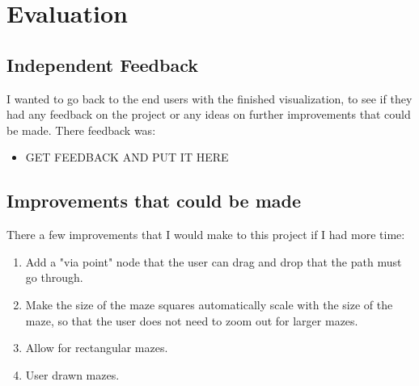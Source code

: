 \documentclass[titlepage]{article}
\begin{document}
\section{Evaluation}
\subsection{Independent Feedback}
I wanted to go back to the end users with the finished visualization, to see if they had any feedback on the project or any ideas on further improvements that could be made.
There feedback was:
\begin{itemize}
    \item GET FEEDBACK AND PUT IT HERE
\end{itemize}
\subsection{Improvements that could be made}
There a few improvements that I would make to this project if I had more time:
\begin{enumerate}
    \item Add a "via point" node that the user can drag and drop that the path must go through.
    \item Make the size of the maze squares automatically scale with the size of the maze, so that the user does not need to zoom out for larger mazes.
    \item Allow for rectangular mazes.
    \item User drawn mazes.
\end{enumerate}
\end{document}
